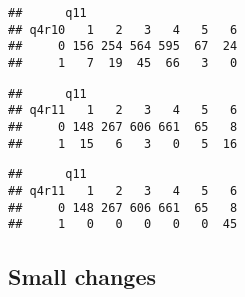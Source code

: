 \documentclass[]{article}
\newenvironment{Shaded}{\begin{snugshade}}{\end{snugshade}}
\newcommand{\KeywordTok}[1]{\textcolor[rgb]{0.13,0.29,0.53}{\textbf{#1}}}
\newcommand{\DataTypeTok}[1]{\textcolor[rgb]{0.13,0.29,0.53}{#1}}
\newcommand{\DecValTok}[1]{\textcolor[rgb]{0.00,0.00,0.81}{#1}}
\newcommand{\StringTok}[1]{\textcolor[rgb]{0.31,0.60,0.02}{#1}}
\newcommand{\CommentTok}[1]{\textcolor[rgb]{0.56,0.35,0.01}{\textit{#1}}}
\newcommand{\OtherTok}[1]{\textcolor[rgb]{0.56,0.35,0.01}{#1}}
\newcommand{\OperatorTok}[1]{\textcolor[rgb]{0.81,0.36,0.00}{\textbf{#1}}}
\newcommand{\NormalTok}[1]{#1}
\begin{document}
\begin{Shaded}
\end{Shaded}

\begin{verbatim}
##      q11
## q4r10   1   2   3   4   5   6
##     0 156 254 564 595  67  24
##     1   7  19  45  66   3   0
\end{verbatim}

\begin{Shaded}
\end{Shaded}

\begin{verbatim}
##      q11
## q4r11   1   2   3   4   5   6
##     0 148 267 606 661  65   8
##     1  15   6   3   0   5  16
\end{verbatim}

\begin{Shaded}
\end{Shaded}

\begin{verbatim}
##      q11
## q4r11   1   2   3   4   5   6
##     0 148 267 606 661  65   8
##     1   0   0   0   0   0  45
\end{verbatim}

\subsection{Small changes}\label{small-changes}
\end{document}
